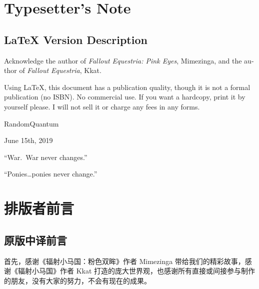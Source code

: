 \layoutenglish

\chapter{Typesetter's Note}

\pagestyle{english}

\begin{english}

\section*{\LaTeX{} Version Description}

Acknowledge the author of \emph{Fallout Equestria: Pink Eyes}, Mimezinga, and the author of \emph{Fallout Equestria}, Kkat.

Using \LaTeX{}, this document has a publication quality, though it is not a formal publication (no ISBN). No commercial use. If you want a hardcopy, print it by yourself please. I will not sell it or charge any fees in any forms.

\begin{flushright}
RandomQuantum

June 15th, 2019
\end{flushright}

\clearpage

\begin{motto}
``War. War never changes.''

\medskip

``Ponies\dots ponies never change.''
\end{motto}

\end{english}


\layoutchinese

\chapter{排版者前言}

\pagestyle{chinese}

\section*{原版中译前言}

首先，感谢《辐射小马国：粉色双眸》作者 Mimezinga 带给我们的精彩故事，感谢《辐射小马国》作者 Kkat 打造的庞大世界观，也感谢所有直接或间接参与制作的朋友，没有大家的努力，不会有现在的成果。

